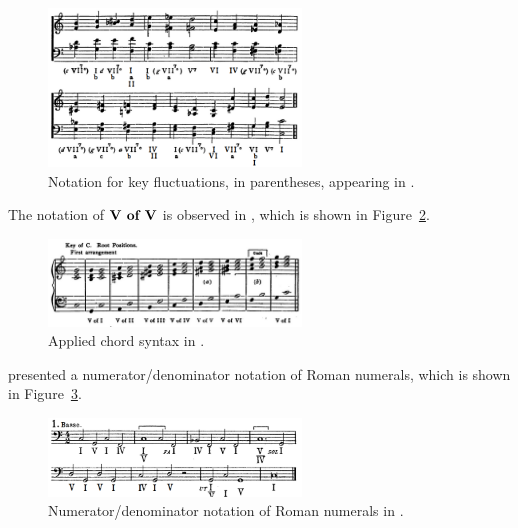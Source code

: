 \begin{figure}[h!]
    \centering
    \includegraphics[width=0.6\textwidth]{figures/chapter/2/primary_sources/white1911harmonic110.png}
    \caption{Notation for key fluctuations, in parentheses, appearing in \textcite{white1911harmonic}.}
    \label{fig:white1911harmonic110}
\end{figure}

The notation of $\textbf{V of V}\relax\relax$ is observed in \textcite{mokrejs1913lessons}, which is shown in Figure~\ref{fig:mokrejs1913lessons079}.

\begin{figure}[h!]
    \centering
    \includegraphics[width=0.6\textwidth]{figures/chapter/2/primary_sources/mokrejs1913lessons079.png}
    \caption{Applied chord syntax in \textcite{mokrejs1913lessons}.}
    \label{fig:mokrejs1913lessons079}
\end{figure}

\textcite{gilson1919traite} presented a numerator/denominator notation of Roman numerals, which is shown in Figure~\ref{fig:gilson1919traite049}.

\begin{figure}[h!]
    \centering
    \includegraphics[width=0.6\textwidth]{figures/chapter/2/primary_sources/gilson1919traite049.png}
    \caption{Numerator/denominator notation of Roman numerals in \textcite{gilson1919traite}.}
    \label{fig:gilson1919traite049}
\end{figure}

